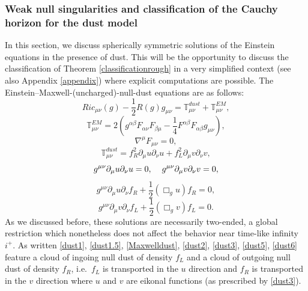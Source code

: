 \documentclass[10pt,a4paper]{article}
\theoremstyle{plain}
\theoremstyle{remark}
\theoremstyle{definition}
\theoremstyle{plain}
\theoremstyle{remark}
\theoremstyle{definition}
\numberwithin{equation}{section}
\begin{document}
\subsubsection{Weak null singularities and classification of the Cauchy horizon for the dust model } \label{dustweaknull}

In this section, we discuss spherically symmetric solutions of the Einstein equations in the presence of dust. This will be the opportunity to discuss the classification of Theorem \ref{classificationrough} in a very simplified context (see also Appendix \ref{appendix}) where explicit computations are possible. The Einstein--Maxwell-(uncharged)-null-dust equations are as follows:
\begin{equation} \label{dust1} Ric_{\mu \nu}(g)- \frac{1}{2}R(g)g_{\mu \nu}= \mathbb{T}_{\mu \nu}^{dust}+\mathbb{T}_{\mu \nu}^{EM},     \end{equation} 	\begin{equation}  \label{dust1.5} \mathbb{T}^{EM}_{\mu \nu}=2\left(g^{\alpha \beta}F _{\alpha \nu}F_{\beta \mu }-\frac{1}{4}F^{\alpha \beta}F_{\alpha \beta}g_{\mu \nu}\right),
\end{equation}
\begin{equation} \label{Maxwelldust} \nabla^{\mu} F_{\mu \nu}=0,
\end{equation} 
\begin{equation} \label{dust2}
\mathbb{T}_{\mu \nu}^{dust}= f^2_R \partial_{\mu}u \partial_{\nu}u+
f^2_L \partial_{\mu}v \partial_{\nu}v,
\end{equation}
\begin{equation} \label{dust3}
g^{\mu \nu}\partial_{\mu}u \partial_{\nu}u=0, \hskip 4 mm g^{\mu \nu}\partial_{\mu}v \partial_{\nu}v=0, 
\end{equation}
\begin{equation} \label{dust5}
g^{\mu \nu}\partial_{\mu}u \partial_{\nu}f_R +\frac{1}{2} (\Box_{g}u)f_R=0,
\end{equation}
\begin{equation} \label{dust6}
g^{\mu \nu}\partial_{\mu}v \partial_{\nu}f_L +\frac{1}{2} (\Box_{g}v)f_L=0.
\end{equation}As we discussed before, these solutions are necessarily two-ended, a global restriction which nonetheless does not affect the behavior near time-like infinity $i^+$. As written \eqref{dust1}, \eqref{dust1.5}, \eqref{Maxwelldust}, \eqref{dust2}, \eqref{dust3}, \eqref{dust5}, \eqref{dust6} feature a cloud of ingoing null dust of density $f_L$ and a cloud of outgoing null dust of density $f_R$, i.e.\ $f_L$ is transported in the $u$ direction and $f_R$ is transported in the $v$ direction where $u$ and $v$ are eikonal functions (as prescribed by \eqref{dust3}). 
\end{document}

